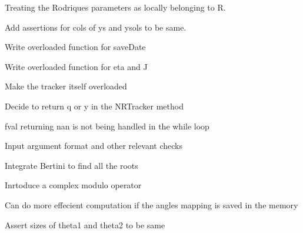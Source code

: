 \begin{DoxyRefList}
Treating the Rodriques parameters as locally belonging to R. 

Add assertions for cols of ys and ysols to be same.  
\item[Member \mbox{\hyperlink{classRootTracker_a81f1227c2436cf1a84a7b8608b683bdd}{Root\+Tracker::N\+R\+C\+Tracker}} (Vector\+Xcd x, Vector\+Xcd y, std\+::function$<$ Vector\+Xcd(\+Vector\+Xcd)$>$ f, std\+::function$<$ Matrix\+Xcd(\+Vector\+Xcd)$>$ Jfy, double eps=pow(10, -\/10))]\label{todo__todo000003}%
%
Write overloaded function for save\+Date 

Write overloaded function for eta and J 

Make the tracker itself overloaded  
\item[Member \mbox{\hyperlink{classRootTracker_a6bb3dcb73ea58ac44ab15d7803de3d5a}{Root\+Tracker::N\+R\+Tracker}} (Vector\+Xd x, Vector\+Xd y, std\+::function$<$ Vector\+Xd(\+Vector\+Xd)$>$ f, std\+::function$<$ Matrix\+Xd(\+Vector\+Xd)$>$ Jfy, double eps=pow(10, -\/10))]\label{todo__todo000002}%
%
Decide to return q or y in the N\+R\+Tracker method 

fval returning nan is not being handled in the while loop 

Input argument format and other relevant checks  
\item[Member \mbox{\hyperlink{classRootTracker_ada1cf0e1ae31392f075fe5f92972f17f}{Root\+Tracker::Singularity\+Event\+Identifier}} (Vector\+Xd ys, Matrix\+Xd ysols, int index, double eps=pow(10, -\/2))]\label{todo__todo000006}%
%
Integrate Bertini to find all the roots  
\item[Member \mbox{\hyperlink{utils_8hh_a5d8b5ec8d7d9f33e2b89dbd54a9dfbd6}{s1\+C\+Dist}} (Vector\+Xcd theta1, Vector\+Xcd theta2)]\label{todo__todo000011}%
%
Inrtoduce a complex modulo operator  
\item[Member \mbox{\hyperlink{utils_8hh_aa55cfeada673b3ce1ce1e504925e117c}{s1\+Dist}} (Vector\+Xd theta1, Vector\+Xd theta2)]\label{todo__todo000010}%
%
Can do more effecient computation if the angles mapping is saved in the memory 

Assert sizes of theta1 and theta2 to be same 
\end{DoxyRefList}